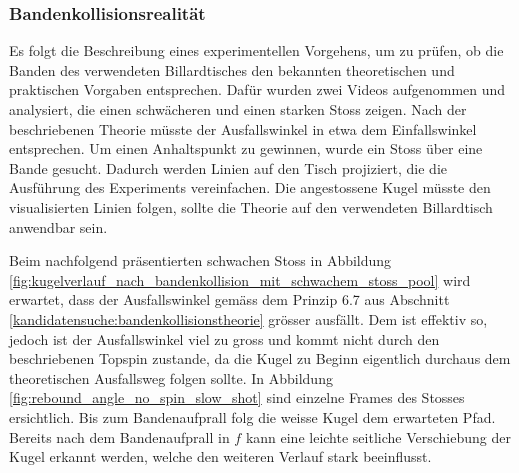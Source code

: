 \subsubsection{Bandenkollisionsrealität}
Es folgt die Beschreibung eines experimentellen Vorgehens, um zu prüfen, ob die Banden des verwendeten Billardtisches den
bekannten theoretischen und praktischen Vorgaben entsprechen. Dafür wurden zwei Videos aufgenommen und analysiert,
die einen schwächeren und einen starken Stoss zeigen.
Nach der beschriebenen Theorie müsste der Ausfallswinkel in etwa dem Einfallswinkel entsprechen.
Um einen Anhaltspunkt zu gewinnen, wurde ein Stoss
über eine Bande gesucht. Dadurch werden Linien auf den Tisch projiziert, die die Ausführung des Experiments vereinfachen.
Die angestossene Kugel müsste den visualisierten Linien folgen, sollte die Theorie auf den verwendeten Billardtisch
anwendbar sein.

Beim nachfolgend präsentierten schwachen Stoss in Abbildung \ref{fig:kugelverlauf_nach_bandenkollision_mit_schwachem_stoss_pool} wird erwartet, dass der Ausfallswinkel gemäss dem Prinzip 6.7 aus
Abschnitt \ref{kandidatensuche:bandenkollisionstheorie} grösser ausfällt. Dem ist effektiv so, jedoch ist
der Ausfallswinkel viel zu gross und kommt nicht durch den beschriebenen Topspin zustande, da die Kugel zu Beginn
eigentlich durchaus dem theoretischen Ausfallsweg folgen sollte. In Abbildung \ref{fig:rebound_angle_no_spin_slow_shot} sind
einzelne Frames des Stosses ersichtlich. Bis zum Bandenaufprall folg die weisse Kugel dem erwarteten Pfad. Bereits nach
dem Bandenaufprall in $f$ kann eine leichte seitliche Verschiebung der Kugel erkannt werden, welche den weiteren Verlauf
stark beeinflusst.

